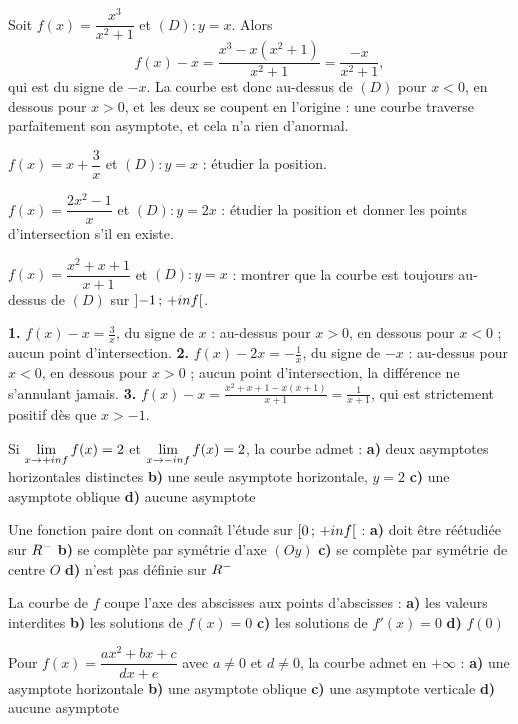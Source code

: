 \begin{exemple}
Soit $f(x) = \dfrac{x^{3}}{x^{2}+1}$ et $(D) : y = x$. Alors
\[
  f(x)-x = \frac{x^{3}-x\left(x^{2}+1\right)}{x^{2}+1} = \frac{-x}{x^{2}+1},
\]
qui est du signe de $-x$. La courbe est donc au-dessus de $(D)$ pour
$x<0$, en dessous pour $x>0$, et les deux se coupent en l'origine : une
courbe traverse parfaitement son asymptote, et cela n'a rien d'anormal.
\end{exemple}

\begin{entrainement}
\exo[\niveau{1}] $f(x) = x+\dfrac{3}{x}$ et $(D) : y = x$ : étudier la
position.

\exo[\niveau{2}] $f(x) = \dfrac{2x^{2}-1}{x}$ et $(D) : y = 2x$ : étudier la
position et donner les points d'intersection s'il en existe.

\exo[\niveau{3}] $f(x) = \dfrac{x^{2}+x+1}{x+1}$ et $(D) : y = x$ : montrer
que la courbe est toujours au-dessus de $(D)$ sur
$\left]-1\,;\,+inf\right[$.
\end{entrainement}

\begin{corrige}
\textbf{1.} $f(x)-x = \frac3x$, du signe de $x$ : au-dessus pour $x>0$, en
dessous pour $x<0$ ; aucun point d'intersection.
\textbf{2.} $f(x)-2x = -\frac1x$, du signe de $-x$ : au-dessus pour $x<0$,
en dessous pour $x>0$ ; aucun point d'intersection, la différence ne
s'annulant jamais.
\textbf{3.} $f(x)-x = \frac{x^{2}+x+1-x(x+1)}{x+1} = \frac{1}{x+1}$, qui est
strictement positif dès que $x>-1$.
\end{corrige}

\begin{qcm}
\exo Si $\limpinf f(x) = 2$ et $\limminf f(x) = 2$, la courbe admet :
\textbf{a)} deux asymptotes horizontales distinctes \quad
\textbf{b)} une seule asymptote horizontale, $y = 2$ \quad
\textbf{c)} une asymptote oblique \quad \textbf{d)} aucune asymptote

\exo Une fonction paire dont on connaît l'étude sur $\left[0\,;\,+inf\right[$ :
\textbf{a)} doit être réétudiée sur $R^{-}$ \quad
\textbf{b)} se complète par symétrie d'axe $(Oy)$ \quad
\textbf{c)} se complète par symétrie de centre $O$ \quad
\textbf{d)} n'est pas définie sur $R^{-}$ 

\exo La courbe de $f$ coupe l'axe des abscisses aux points d'abscisses :
\textbf{a)} les valeurs interdites \quad \textbf{b)} les solutions de
$f(x) = 0$ \quad \textbf{c)} les solutions de $f'(x) = 0$ \quad
\textbf{d)} $f(0)$ 

\exo Pour $f(x) = \dfrac{ax^{2}+bx+c}{dx+e}$ avec $a \neq 0$ et $d \neq 0$,
la courbe admet en $+\infty$ :
\textbf{a)} une asymptote horizontale \quad \textbf{b)} une asymptote
oblique \quad \textbf{c)} une asymptote verticale \quad \textbf{d)} aucune
asymptote 
\end{qcm}

